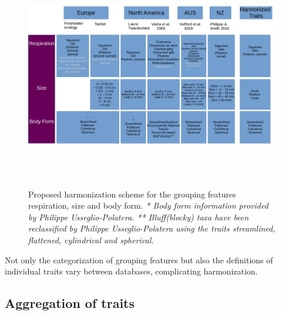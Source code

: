 \documentclass{article}
\begin{document}
\begin{figure}[H]
    \centering
    \includegraphics[width=16.5cm, height=10cm]{trait_overview2.jpg}
    \caption{Proposed harmonization scheme for the grouping features
    respiration, size and body form.\newline
    \textit{* Body form information provided by Philippe 
    Usseglio-Polatera.}\newline
    \textit{** Bluff(blocky) taxa have been reclassified
    by Philippe Usseglio-Polatera using the traits streamlined,
    flattened, cylindrical and spherical.} }
    \label{fig:harmon_overview_2}
 \end{figure}

Not only the categorization of grouping features but also the definitions of individual traits vary between
databases, complicating harmonization. 

\subsection{Aggregation of traits}
\end{document}
